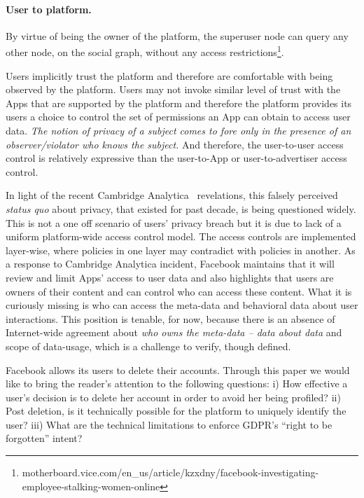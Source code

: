 \documentclass[runningheads]{llncs}
\begin{document}
\paragraph{User to platform.} By virtue of being the owner of the
platform, the superuser node can query any other node, on the social
graph, without any access
restrictions\footnote{motherboard.vice.com/en\_us/article/kzxdny/facebook-investigating-employee-stalking-women-online}.

Users implicitly trust the platform and therefore are comfortable with
being observed by the platform. Users may not invoke similar level of
trust with the Apps that are supported by the platform and therefore
the platform provides its users a choice to control the set of
permissions an App can obtain to access user data. \textit{The notion
  of privacy of a subject comes to fore only in the presence of an
  observer/violator who knows the subject.} And therefore, the
user-to-user access control is relatively expressive than the
user-to-App or user-to-advertiser access control.

In light of the recent Cambridge Analytica~\cite{fb-ca-lse}
revelations, this falsely perceived \textit{status quo} about privacy,
that existed for past decade, is being questioned widely. This is not
a one off scenario of users' privacy breach but it is due to lack of a
uniform platform-wide access control model. The access controls are
implemented layer-wise, where policies in one layer may contradict
with policies in another. As a response to Cambridge Analytica
incident, Facebook maintains that it will review and limit Apps'
access to user data and also highlights that users are owners of their
content and can control who can access these content. What it is
curiously missing is who can access the meta-data and behavioral data
about user interactions. This position is tenable, for now, because
there is an absence of Internet-wide agreement about \textit{who owns
  the meta-data -- data about data} and scope of data-usage, which is
a challenge to verify, though defined.

Facebook allows its users to delete their accounts. Through this paper
we would like to bring the reader's attention to the following
questions: i) How effective a user's decision is to delete her account
in order to avoid her being profiled? ii) Post deletion, is it
technically possible for the platform to uniquely identify the user?
iii) What are the technical limitations to enforce GDPR's ``right to
be forgotten'' intent?
\end{document}
